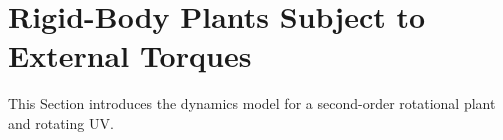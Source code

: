 \section{Rigid-Body Plants Subject to External Torques }

This Section introduces the dynamics model for a second-order rotational
plant and rotating \ac{UV}. 
%
